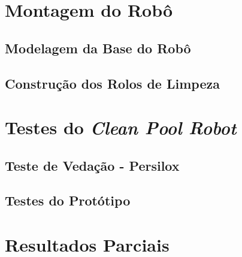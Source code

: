 \chapter{Montagem do Robô}
  \section{Modelagem da Base do Robô}
  \section{Construção dos Rolos de Limpeza}

\chapter{Testes do \textit{Clean Pool Robot}}
  \section{Teste de Vedação - Persilox}
  \section{Testes do Protótipo}
  
\chapter{Resultados Parciais}
  















